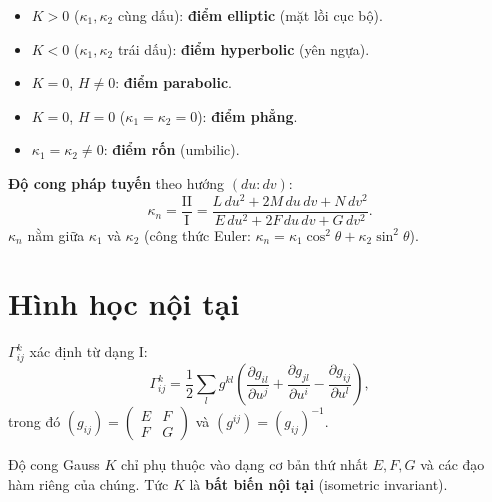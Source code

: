 \documentclass[12pt,a4paper]{article}
\begin{document}
\begin{dinhnghia}[title={Phân loại điểm trên mặt}]
  \begin{itemize}
    \item $K > 0$ ($\kappa_1, \kappa_2$ cùng dấu): \textbf{điểm elliptic} (mặt lồi cục bộ).
    \item $K < 0$ ($\kappa_1, \kappa_2$ trái dấu): \textbf{điểm hyperbolic} (yên ngựa).
    \item $K = 0$, $H \ne 0$: \textbf{điểm parabolic}.
    \item $K = 0$, $H = 0$ ($\kappa_1 = \kappa_2 = 0$): \textbf{điểm phẳng}.
    \item $\kappa_1 = \kappa_2 \ne 0$: \textbf{điểm rốn} (umbilic).
  \end{itemize}
\end{dinhnghia}

\begin{dinhnghia}[title={Đường cong pháp tuyến và định lý Meusnier}]
  \textbf{Độ cong pháp tuyến} theo hướng $(du : dv)$:
  \[
    \kappa_n = \frac{\mathrm{II}}{\mathrm{I}} = \frac{L\,du^2 + 2M\,du\,dv + N\,dv^2}{E\,du^2 + 2F\,du\,dv + G\,dv^2}.
  \]
  $\kappa_n$ nằm giữa $\kappa_1$ và $\kappa_2$ (công thức Euler: $\kappa_n = \kappa_1\cos^2\theta + \kappa_2\sin^2\theta$).
\end{dinhnghia}

\section{Hình học nội tại}

\begin{dinhnghia}[title={Ký hiệu Christoffel}]
  $\Gamma^k_{ij}$ xác định từ dạng I:
  \[
    \Gamma^k_{ij} = \frac{1}{2}\sum_l g^{kl}\left(\frac{\partial g_{il}}{\partial u^j} + \frac{\partial g_{jl}}{\partial u^i} - \frac{\partial g_{ij}}{\partial u^l}\right),
  \]
  trong đó $(g_{ij}) = \begin{pmatrix} E & F \\ F & G \end{pmatrix}$ và $(g^{ij}) = (g_{ij})^{-1}$.
\end{dinhnghia}

\begin{dinhly}[title={Theorema Egregium (Gauss)}]
  Độ cong Gauss $K$ chỉ phụ thuộc vào dạng cơ bản thứ nhất $E, F, G$ và các đạo hàm riêng của chúng. Tức $K$ là \textbf{bất biến nội tại} (isometric invariant).
\end{dinhly}
\end{document}
